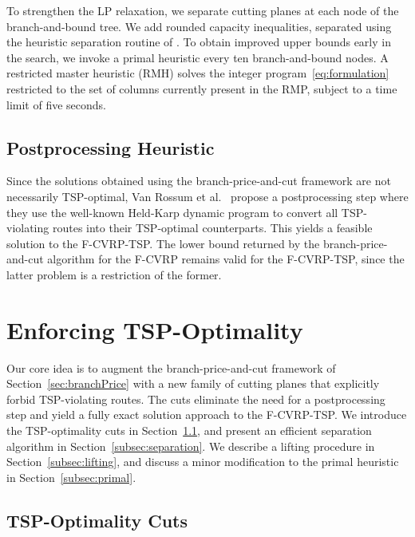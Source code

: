 \documentclass[a4paper,fleqn]{cas-dc}%
\newcommand{\CitetVR}[1]{Van Rossum et al.\ \cite{#1}}
\begin{document}
To strengthen the LP relaxation, we separate cutting planes at each node of the branch-and-bound tree. We add rounded capacity inequalities, separated using the heuristic separation routine of \citet{lysgaard2004new}. To obtain improved upper bounds early in the search, we invoke a primal heuristic every ten branch-and-bound nodes. A restricted master heuristic (RMH) solves the integer program~\eqref{eq:formulation} restricted to the set of columns currently present in the RMP, subject to a time limit of five seconds.

\subsection{Postprocessing Heuristic}
\label{subsec:postprocess}

Since the solutions obtained using the branch-price-and-cut framework are not necessarily TSP-optimal, \CitetVR{rossum2025efficient} propose a postprocessing step where they use the well-known Held-Karp dynamic program \citep{held1962dynamic} to convert all TSP-violating routes into their TSP-optimal counterparts. This yields a feasible solution to the F-CVRP-TSP. The lower bound returned by the branch-price-and-cut algorithm for the F-CVRP remains valid for the F-CVRP-TSP, since the latter problem is a restriction of the former. 

\section{Enforcing TSP-Optimality}
\label{sec:cuts}

Our core idea is to augment the branch-price-and-cut framework of Section~\ref{sec:branchPrice} with a new family of cutting planes that explicitly forbid TSP-violating routes. The cuts eliminate the need for a postprocessing step and yield a fully exact solution approach to the F-CVRP-TSP. We introduce the TSP-optimality cuts in Section~\ref{subsec:cuts}, and present an efficient separation algorithm in Section~\ref{subsec:separation}. We describe a lifting procedure in Section~\ref{subsec:lifting}, and discuss a minor modification to the primal heuristic in Section~\ref{subsec:primal}.

\subsection{TSP-Optimality Cuts}
\label{subsec:cuts}
\end{document}
